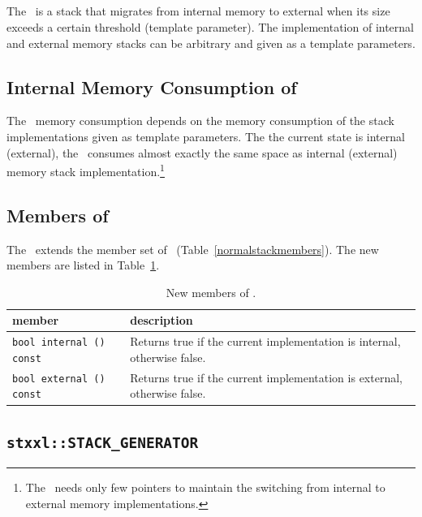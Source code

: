 \documentclass[twoside]{book}
\begin{document}
\subsection{\xmstack}
The \xmstack\ is a stack that migrates from internal memory to
external when its size exceeds a certain threshold (template
parameter). The implementation
of internal and external memory stacks can be arbitrary and given as a
template parameters.


\subsection*{Internal Memory Consumption of \xmstack}
The \xmstack\ memory consumption depends on the memory consumption of
the stack implementations given as template parameters. The the
current state is internal (external), the \xmstack\ consumes almost
exactly the same space as internal (external) memory stack
implementation.\footnote{The \xmstack\ needs only few pointers to
maintain the switching from internal to external memory
implementations.}  

\subsection*{Members of \xmstack}
The \xmstack\ extends the member set of \xnormalstack\
(Table~\ref{normalstackmembers}). The new members are listed in
Table~\ref{migratingstackmembers}. 
\begin{table}[h]
\begin{center}
\caption{New members of \xmstack.}
\label{migratingstackmembers}
\begin{tabular}{|p{6cm}|p{5cm}|}
\hline
member & description  \\
\hline\hline
\texttt{bool    internal () const} & Returns true if the current
implementation is internal, otherwise false. \\ 
\hline
\texttt{bool    external () const} & Returns true if the current
implementation is external, otherwise false. \\
\hline
\end{tabular}
\end{center}
\end{table}

\newcommand{\xstackg}{\texttt{stxxl::STACK\_GENERATOR}}

\subsection{\xstackg}
\label{stackgensection}
\end{document}
